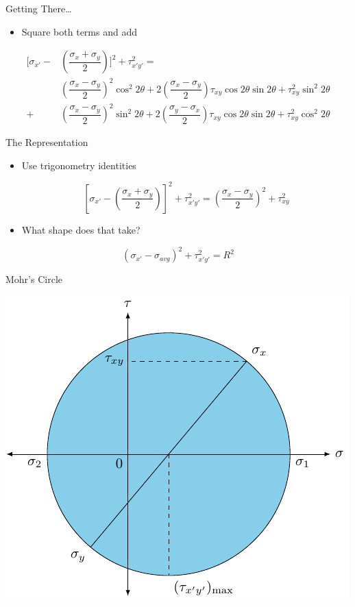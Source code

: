 \documentclass[10pt, svgnames]{beamer}
\begin{document}
\begin{frame}[label={sec:org94440c8}]{Getting There\ldots{}}
\begin{itemize}
\item Square both terms and add
\end{itemize}

\begin{align*}
    \Biggl[ \sigma_{x'} -& \left( \dfrac{\sigma_x + \sigma_y}{2} \right) \Biggr]^2 + \tau_{x'y'}^2 = \\
     & \left( \dfrac{\sigma_x - \sigma_y}{2} \right)^2\cos^2 2\theta  + 2\left( \dfrac{\sigma_x - \sigma_y}{2} \right)\tau_{xy}\cos 2\theta \sin 2\theta + \tau_{xy}^2\sin^2 2\theta \\
    +& \left( \dfrac{\sigma_x - \sigma_y}{2} \right)^2 \sin^2 2\theta  + 2\left( \dfrac{\sigma_y - \sigma_x}{2} \right)\tau_{xy}\cos 2\theta \sin 2\theta  + \tau_{xy}^2\cos^2 2\theta
\end{align*}
\end{frame}

\begin{frame}[label={sec:org3c9cf76}]{The Representation}
\begin{itemize}
\item Use trigonometry identities

\[\left[ \sigma_{x'} - \left( \dfrac{\sigma_x + \sigma_y}{2} \right) \right]^2 + \tau_{x'y'}^2 = \left( \dfrac{\sigma_x - \sigma_y}{2} \right)^2 + \tau_{xy}^2\]

\item What shape does that take?
\end{itemize}

\[\left( \sigma_{x'} - \sigma_{avg} \right)^2 + \tau_{x'y'}^2 = R^2\]
\end{frame}

\begin{frame}[label={sec:org3da0ade}]{Mohr's Circle}
\begin{center}
\includegraphics[height=0.9\textheight]{pictures/mohrs-circle.pdf}
\end{center}
\end{frame}
\end{document}

